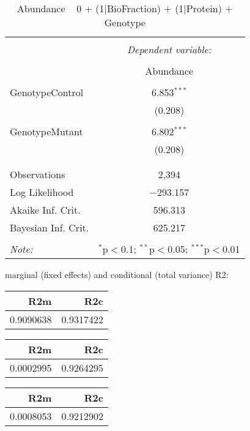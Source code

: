 \documentclass[11pt]{report}
\begin{document}
\begin{table}[!htbp] \centering 
  \caption{Abundance ~ 0 + (1|BioFraction) + (1|Protein) + Genotype} 
  \label{} 
\begin{tabular}{@{\extracolsep{5pt}}lc} 
\\[-1.8ex]\hline 
\hline \\[-1.8ex] 
 & \multicolumn{1}{c}{\textit{Dependent variable:}} \\ 
\cline{2-2} 
\\[-1.8ex] & Abundance \\ 
\hline \\[-1.8ex] 
 GenotypeControl & 6.853$^{***}$ \\ 
  & (0.208) \\ 
  & \\ 
 GenotypeMutant & 6.802$^{***}$ \\ 
  & (0.208) \\ 
  & \\ 
\hline \\[-1.8ex] 
Observations & 2,394 \\ 
Log Likelihood & $-$293.157 \\ 
Akaike Inf. Crit. & 596.313 \\ 
Bayesian Inf. Crit. & 625.217 \\ 
\hline 
\hline \\[-1.8ex] 
\textit{Note:}  & \multicolumn{1}{r}{$^{*}$p$<$0.1; $^{**}$p$<$0.05; $^{***}$p$<$0.01} \\ 
\end{tabular} 
\end{table} 
marginal (fixed effects) and conditional (total variance) R2:

\begin{tabular}{r|r}
\hline
R2m & R2c\\
\hline
0.9090638 & 0.9317422\\
\hline
\end{tabular}

\begin{tabular}{r|r}
\hline
R2m & R2c\\
\hline
0.0002995 & 0.9264295\\
\hline
\end{tabular}

\begin{tabular}{r|r}
\hline
R2m & R2c\\
\hline
0.0008053 & 0.9212902\\
\hline
\end{tabular}
\end{document}
